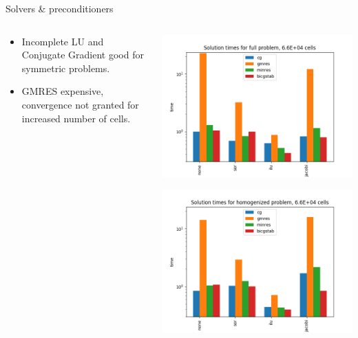 \documentclass{beamer}
\begin{document}
\begin{frame}[t]{Solvers \& preconditioners}
  \begin{columns}
    \begin{column}[c]{.5\textwidth}
      \begin{itemize}
      \item Incomplete LU and Conjugate Gradient good for symmetric problems.
      \item GMRES expensive, convergence not granted for increased number of cells.
    \end{itemize}
  \end{column}
  \begin{column}[c]{.5\textwidth}

    \includegraphics[width=0.9\linewidth]{SolverTimesFullh8.png}

    \includegraphics[width=0.9\linewidth]{SolverTimesHomoh8.png}

 \end{column}
\end{columns}
\end{frame}
\end{document}
